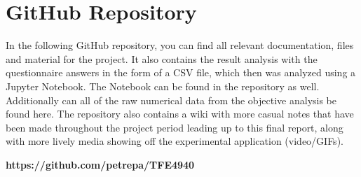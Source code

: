 \chapter{GitHub Repository}\label{cha:appendix-github}
In the following GitHub repository, you can find all relevant documentation, files and material for the project. It also contains the result analysis with the questionnaire answers in the form of a CSV file, which then was analyzed using a Jupyter Notebook. The Notebook can be found in the repository as well. Additionally can all of the raw numerical data from the objective analysis be found here. The repository also contains a wiki with more casual notes that have been made throughout the project period leading up to this final report, along with more lively media showing off the experimental application (video/GIFs). 

\begin{displayquote}
    \large \textbf{https://github.com/petrepa/TFE4940}
\end{displayquote}

%

%

